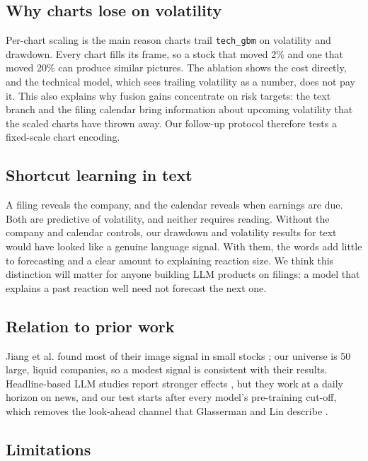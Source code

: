 \documentclass[conference]{IEEEtran}
\begin{document}
\subsection{Why charts lose on volatility}

Per-chart scaling is the main reason charts trail \texttt{tech\_gbm} on volatility and drawdown. Every chart fills its frame, so a stock that moved 2\% and one that moved 20\% can produce similar pictures. The ablation shows the cost directly, and the technical model, which sees trailing volatility as a number, does not pay it. This also explains why fusion gains concentrate on risk targets: the text branch and the filing calendar bring information about upcoming volatility that the scaled charts have thrown away. Our follow-up protocol therefore tests a fixed-scale chart encoding.

\subsection{Shortcut learning in text}

A filing reveals the company, and the calendar reveals when earnings are due. Both are predictive of volatility, and neither requires reading. Without the company and calendar controls, our drawdown and volatility results for text would have looked like a genuine language signal. With them, the words add little to forecasting and a clear amount to explaining reaction size. We think this distinction will matter for anyone building LLM products on filings: a model that explains a past reaction well need not forecast the next one.

\subsection{Relation to prior work}

Jiang et al. found most of their image signal in small stocks \cite{jkx2023}; our universe is 50 large, liquid companies, so a modest signal is consistent with their results. Headline-based LLM studies report stronger effects \cite{lopezlira2023}, but they work at a daily horizon on news, and our test starts after every model's pre-training cut-off, which removes the look-ahead channel that Glasserman and Lin describe \cite{glasserman2023}.

\subsection{Limitations}
\end{document}
